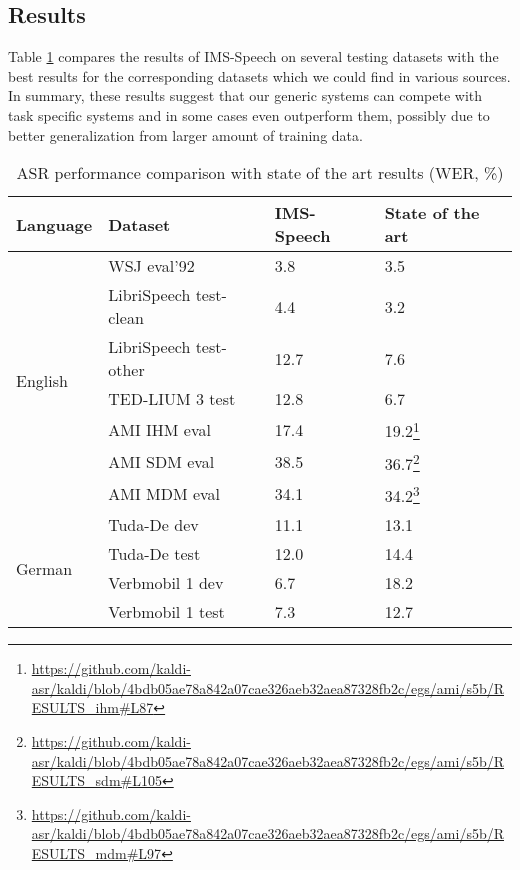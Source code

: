 \documentclass[12pt,a4paper]{article}
\begin{document}
\subsection{Results}
Table \ref{tab:results}
compares the results of IMS-Speech on several testing datasets with
the best results for the corresponding datasets which we could
find in various sources.
In summary, these results suggest that our generic systems
can compete with task specific systems and in some cases even outperform them,
possibly due to better generalization from larger amount of training data.

\begin{savenotes}
\begin{table}[H]
 \centering
  \caption{ASR performance comparison with state of the art results (WER, \%)}
  \footnotesize
  \begin{tabular}{|l|l|l|l|}
    \hline
    \textbf{Language} & \textbf{Dataset} & \textbf{IMS-Speech} & \textbf{State of the art} \\
    \hline
    \multirow[t]{7}{*}{English} & WSJ eval'92 & 3.8 & 3.5 \cite{chan2015deep} \\
    \cline{2-4}
    & LibriSpeech test-clean & 4.4 & 3.2 \cite{han2017capio} \\
    \cline{2-4}
    & LibriSpeech test-other & 12.7 & 7.6 \cite{han2017capio} \\
    \cline{2-4}
    & TED-LIUM 3 test & 12.8 & 6.7 \cite{hernandez2018ted} \\
    \cline{2-4}
    & AMI IHM eval & 17.4 & 19.2\footnote{\url{https://github.com/kaldi-asr/kaldi/blob/4bdb05ae78a842a07cae326aeb32aea87328fb2c/egs/ami/s5b/RESULTS_ihm\#L87}} \\
    \cline{2-4}
    & AMI SDM eval & 38.5 & 36.7\footnote{\url{https://github.com/kaldi-asr/kaldi/blob/4bdb05ae78a842a07cae326aeb32aea87328fb2c/egs/ami/s5b/RESULTS_sdm\#L105}} \\
    \cline{2-4}
    & AMI MDM eval & 34.1 & 34.2\footnote{\url{https://github.com/kaldi-asr/kaldi/blob/4bdb05ae78a842a07cae326aeb32aea87328fb2c/egs/ami/s5b/RESULTS_mdm\#L97}} \\
    \hline
    \multirow[t]{4}{*}{German} & Tuda-De dev & 11.1 & 13.1 \cite{milde-koehn-18-german-asr} \\
    \cline{2-4}
    & Tuda-De test & 12.0 & 14.4 \cite{milde-koehn-18-german-asr} \\
    \cline{2-4}
    & Verbmobil 1 dev & 6.7 & 18.2 \cite{milde-koehn-18-german-asr} \\
    \cline{2-4}
    & Verbmobil 1 test & 7.3 & 12.7 \cite{gaida2014comparing} \\
    \hline
  \end{tabular}
  \label{tab:results}
\end{table}
\end{savenotes}
\end{document}
